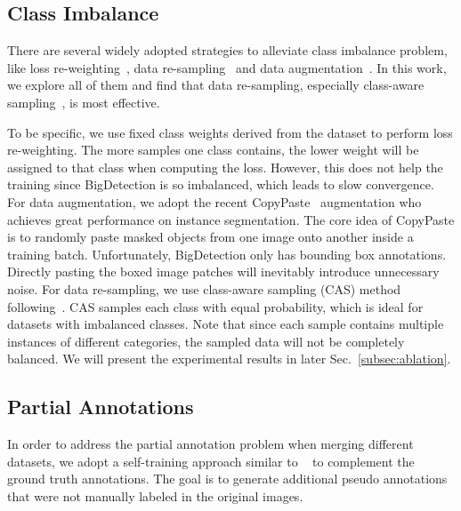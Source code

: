 \documentclass[10pt,twocolumn,letterpaper]{article}
\begin{document}
\subsection{Class Imbalance}
\label{subsec:imbalance}
There are several widely adopted strategies to alleviate class imbalance problem, like loss re-weighting~\cite{tan2020equalization, li2020overcoming, wang2021seesaw}, data re-sampling~\cite{chang2021image, shen2016relay, gupta2019lvis} and data augmentation~\cite{ghiasi2021simple, zhang2021mosaicos}. In this work, we explore all of them and find that data re-sampling, especially class-aware sampling~\cite{shen2016relay}, is most effective.

To be specific, we use fixed class weights derived from the dataset to perform loss re-weighting. The more samples one class contains, the lower weight will be assigned to that class when computing the loss. However, this does not help the training since BigDetection is so imbalanced, which leads to slow convergence. For data augmentation, we adopt the recent CopyPaste~\cite{ghiasi2021simple} augmentation who achieves great performance on instance segmentation. 
The core idea of CopyPaste is to randomly paste masked objects from one image onto another inside a training batch. 
Unfortunately, BigDetection only has bounding box annotations. Directly pasting the boxed image patches will inevitably introduce unnecessary noise. 
For data re-sampling, we use class-aware sampling (CAS) method following~\cite{shen2016relay}. CAS samples each class with equal probability, which is ideal for datasets with imbalanced classes. Note that since each sample contains multiple instances of different categories, the sampled data will not be completely balanced. 
We will present the experimental results in later Sec.~\ref{subsec:ablation}.


\subsection{Partial Annotations}
\label{subsec:self-training}
In order to address the partial annotation problem when merging different datasets, we adopt a self-training approach similar to ~\cite{zhao2020object,zhu_2021_csst} to complement the ground truth annotations. The goal is to generate additional pseudo annotations that were not manually labeled in the original images. 
\end{document}
